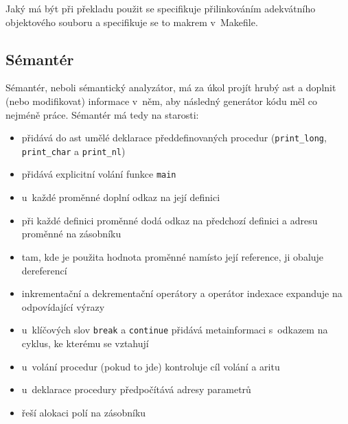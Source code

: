 \documentclass[a4paper,10pt]{article}
\begin{document}
Jaký  má být při překladu použit se specifikuje přilinkováním adekvátního objektového souboru a specifikuje se to makrem v~Makefile.

\subsection{Sémantér}
Sémantér, neboli sémantický analyzátor, má za úkol projít hrubý ast a doplnit (nebo modifikovat) informace v~něm, aby následný generátor kódu měl co nejméně práce. Sémantér má tedy na starosti:
\begin{itemize}
 \item přidává do ast umělé deklarace předdefinovaných procedur (\verb|print_long|, \verb|print_char| a \verb|print_nl|)
 \item přidává explicitní volání funkce \verb|main|
 \item u~každé proměnné doplní odkaz na její definici
 \item při každé definici proměnné dodá odkaz na předchozí definici a adresu proměnné na zásobníku
 \item tam, kde je použita hodnota proměnné namísto její reference, ji obaluje dereferencí
 \item inkrementační a dekrementační operátory a operátor indexace expanduje na odpovídající výrazy
 \item u~klíčových slov \verb|break| a \verb|continue| přidává metainformaci s~odkazem na cyklus, ke kterému se vztahují
 \item u~volání procedur (pokud to jde) kontroluje cíl volání a aritu
 \item u~deklarace procedury předpočítává adresy parametrů
 \item řeší alokaci polí na zásobníku
\end{itemize}
\end{document}
